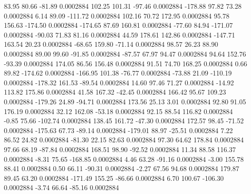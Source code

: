        83.95       80.66      -81.89     0.0002884
      102.25      101.31      -97.46     0.0002884
     -178.88       97.82       73.28     0.0002884
        6.14       89.09     -111.72     0.0002884
      102.16       70.72      172.95     0.0002884
       95.78      156.63     -174.50     0.0002884
     -174.65       87.69      160.81     0.0002884
      -77.60       84.94     -171.07     0.0002884
      -90.03       71.83       81.16     0.0002884
       44.59      178.61      142.86     0.0002884
     -147.71      163.54       20.23     0.0002884
      -68.65      159.80      -71.14     0.0002884
       98.57       26.23       88.90     0.0002884
       89.00       99.60      -91.85     0.0002884
      -87.57       67.97       94.47     0.0002884
       94.64      152.76      -93.39     0.0002884
      174.05       86.56      156.48     0.0002884
       91.51       74.70      168.25     0.0002884
        0.66       89.82     -174.62     0.0002884
     -166.95      101.38      -76.77     0.0002884
      -73.88       21.09     -110.19     0.0002884
     -178.32      161.53      -89.54     0.0002884
       14.60       97.46       71.27     0.0002884
      -14.92      113.82      175.86     0.0002884
       41.58      167.32      -42.45     0.0002884
      166.42       95.67      109.23     0.0002884
     -179.26       24.89      -94.71     0.0002884
      173.56       25.13        3.01     0.0002884
       92.80       91.05      176.19     0.0002884
       32.12      162.08      -53.18     0.0002884
       92.15       88.54      116.82     0.0002884
       -0.85       75.66     -102.74     0.0002884
      138.45      161.72      -47.30     0.0002884
      172.57       98.45      -71.52     0.0002884
     -175.63       67.73      -89.14     0.0002884
     -179.01       88.97      -25.51     0.0002884
        7.22       86.52       24.82     0.0002884
      -81.30       22.15       82.63     0.0002884
       97.30       64.62      178.84     0.0002884
       97.66       68.19      -87.84     0.0002884
      168.51       98.90      -92.52     0.0002884
       11.34       88.58      116.37     0.0002884
       -8.31       75.65     -168.85     0.0002884
        4.46       63.28      -91.16     0.0002884
       -3.00      155.78       88.41     0.0002884
        0.50       66.11      -90.31     0.0002884
       -2.27       67.56       94.68     0.0002884
      179.87       89.45       63.20     0.0002884
     -171.49      155.25      -86.66     0.0002884
        6.70      100.67     -106.30     0.0002884
       -3.74       66.64      -85.16     0.0002884
